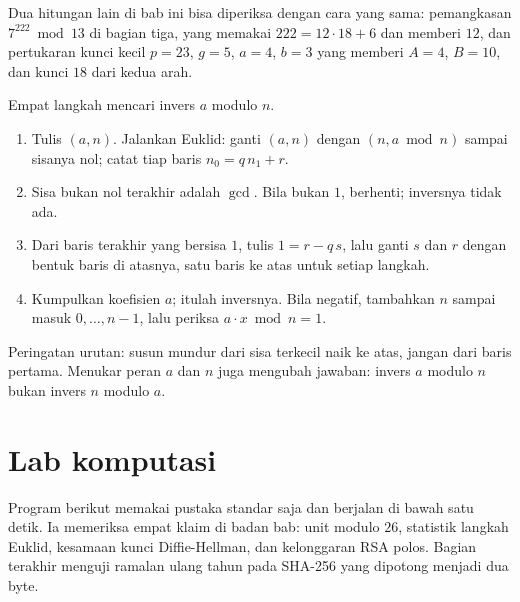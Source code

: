 Dua hitungan lain di bab ini bisa diperiksa dengan cara yang sama: pemangkasan $7^{222}\bmod13$
di bagian tiga, yang memakai $222=12\cdot18+6$ dan memberi $12$, dan pertukaran kunci kecil
$p=23$, $g=5$, $a=4$, $b=3$ yang memberi $A=4$, $B=10$, dan kunci $18$ dari kedua arah.

\begin{resep}
Empat langkah mencari invers $a$ modulo $n$.
\begin{enumerate}
  \item Tulis $(a,n)$. Jalankan Euklid: ganti $(a,n)$ dengan $(n,a\bmod n)$ sampai sisanya
        nol; catat tiap baris $n_0=q\,n_1+r$.
  \item Sisa bukan nol terakhir adalah $\gcd$. Bila bukan $1$, berhenti; inversnya tidak ada.
  \item Dari baris terakhir yang bersisa $1$, tulis $1=r-q\,s$, lalu ganti $s$ dan $r$ dengan
        bentuk baris di atasnya, satu baris ke atas untuk setiap langkah.
  \item Kumpulkan koefisien $a$; itulah inversnya. Bila negatif, tambahkan $n$ sampai masuk
        $0,\dots,n-1$, lalu periksa $a\cdot x\bmod n=1$.
\end{enumerate}
Peringatan urutan: susun mundur dari sisa terkecil naik ke atas, jangan dari baris pertama.
Menukar peran $a$ dan $n$ juga mengubah jawaban: invers $a$ modulo $n$ bukan invers $n$
modulo $a$.
\end{resep}


\section{Lab komputasi}

Program berikut memakai pustaka standar saja dan berjalan di bawah satu detik. Ia memeriksa
empat klaim di badan bab: unit modulo $26$, statistik langkah Euklid, kesamaan kunci
Diffie-Hellman, dan kelonggaran RSA polos. Bagian terakhir menguji ramalan ulang tahun pada
SHA-256 yang dipotong menjadi dua byte.

